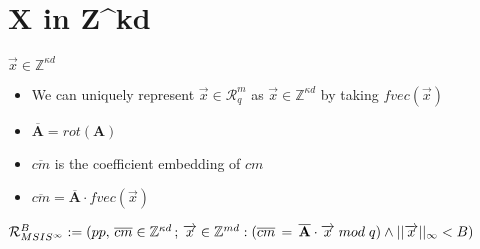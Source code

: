 \section{X in Z^{kd}}
\begin{frame}{$\overrightarrow{x} \in \mathbb{Z}^{\kappa d}$}

    \begin{itemize}
        \item We can uniquely represent $\overrightarrow{x} \in \mathcal{R}^m_q$ as $\overrightarrow{x} \in \mathbb{Z}^{\kappa d}$ by taking $fvec(\overrightarrow{x})$
        \item $\overline{\mathbf{A}} = rot(\mathbf{A})$
        \item $\overline{cm}$ is the coefficient embedding of $cm$
        \item $\overline{cm} = \overline{\mathbf{A}} \cdot fvec(\overrightarrow{x})$
    \end{itemize}
    $\mathcal{R}^B_{MSIS^{\infty}} := {(pp, \, \overline{cm} \in \mathbb{Z}^{\kappa d}\, ;\, \overrightarrow{x}  \in \mathbb{Z}^{m d} : (\overline{cm}\, =\,\overline{ \bf{A}}\cdot \overrightarrow{x} \; mod \; q) \land ||\overrightarrow{x}||_{\infty} < B  )}$
\end{frame}